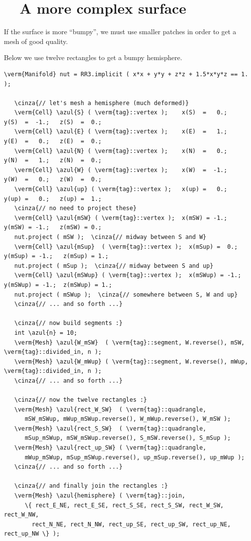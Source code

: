 \section{~~A more complex surface}\label{\numb section 2.\numb parag 6}

If the surface is more ``bumpy'',
we must use smaller patches in order to get a mesh of good quality.

Below we use twelve rectangles to get a bumpy hemisphere.

\begin{Verbatim}[commandchars=\\\{\},formatcom=\small\tt,frame=single,
   label=main-\ref{\numb section 2.\numb parag 6}.cpp,rulecolor=\color{coment},
   baselinestretch=0.94,framesep=2mm]
   \verm{Manifold} nut = RR3.implicit ( x*x + y*y + z*z + 1.5*x*y*z == 1. );

   \cinza{// let's mesh a hemisphere (much deformed)}
   \verm{Cell} \azul{S} ( \verm{tag}::vertex );    x(S)  =   0.;   y(S)  =  -1.;   z(S)  =  0.;
   \verm{Cell} \azul{E} ( \verm{tag}::vertex );    x(E)  =   1.;   y(E)  =   0.;   z(E)  =  0.;
   \verm{Cell} \azul{N} ( \verm{tag}::vertex );    x(N)  =   0.;   y(N)  =   1.;   z(N)  =  0.;
   \verm{Cell} \azul{W} ( \verm{tag}::vertex );    x(W)  =  -1.;   y(W)  =   0.;   z(W)  =  0.;
   \verm{Cell} \azul{up} ( \verm{tag}::vertex );   x(up) =   0.;   y(up) =   0.;   z(up) =  1.;
   \cinza{// no need to project these}
   \verm{Cell} \azul{mSW} ( \verm{tag}::vertex );  x(mSW) = -1.;   y(mSW) = -1.;   z(mSW) = 0.;
   nut.project ( mSW );  \cinza{// midway between S and W}
   \verm{Cell} \azul{mSup}  ( \verm{tag}::vertex );  x(mSup) =  0.;   y(mSup) = -1.;   z(mSup) = 1.;
   nut.project ( mSup );  \cinza{// midway between S and up}
   \verm{Cell} \azul{mSWup} ( \verm{tag}::vertex );  x(mSWup) = -1.;  y(mSWup) = -1.;  z(mSWup) = 1.;
   nut.project ( mSWup );  \cinza{// somewhere between S, W and up}
   \cinza{// ... and so forth ...}
	
   \cinza{// now build segments :}
   int \azul{n} = 10;
   \verm{Mesh} \azul{W_mSW}  ( \verm{tag}::segment, W.reverse(), mSW,  \verm{tag}::divided_in, n );
   \verm{Mesh} \azul{W_mWup} ( \verm{tag}::segment, W.reverse(), mWup, \verm{tag}::divided_in, n );
   \cinza{// ... and so forth ...}

   \cinza{// now the twelve rectangles :}
   \verm{Mesh} \azul{rect_W_SW}  ( \verm{tag}::quadrangle,
      mSW_mSWup, mWup_mSWup.reverse(), W_mWup.reverse(), W_mSW );
   \verm{Mesh} \azul{rect_S_SW}  ( \verm{tag}::quadrangle,
      mSup_mSWup, mSW_mSWup.reverse(), S_mSW.reverse(), S_mSup );
   \verm{Mesh} \azul{rect_up_SW} ( \verm{tag}::quadrangle,
      mWup_mSWup, mSup_mSWup.reverse(), up_mSup.reverse(), up_mWup );
   \cinza{// ... and so forth ...}

   \cinza{// and finally join the rectangles :}
   \verm{Mesh} \azul{hemisphere} ( \verm{tag}::join,
      \{ rect_E_NE, rect_E_SE, rect_S_SE, rect_S_SW, rect_W_SW, rect_W_NW,
        rect_N_NE, rect_N_NW, rect_up_SE, rect_up_SW, rect_up_NE, rect_up_NW \} );
\end{Verbatim}

